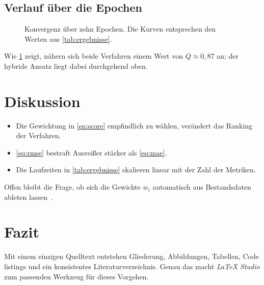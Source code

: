 \documentclass[11pt,a4paper]{article}
\begin{document}
\subsection{Verlauf über die Epochen}

\begin{figure}[htbp]
  \centering
  \caption{Konvergenz über zehn Epochen. Die Kurven entsprechen den Werten aus
    \cref{tab:ergebnisse}.}
  \label{fig:konvergenz}
\end{figure}

Wie \cref{fig:konvergenz} zeigt, nähern sich beide Verfahren einem Wert von
$Q \approx 0{,}87$ an; der hybride Ansatz liegt dabei durchgehend oben.

\section{Diskussion}
\label{sec:diskussion}

\begin{itemize}[leftmargin=*]
  \item Die Gewichtung in \cref{eq:score} empfindlich zu wählen, verändert das
    Ranking der Verfahren.
  \item \cref{eq:rmse} bestraft Ausreißer stärker als \cref{eq:mae}.
  \item Die Laufzeiten in \cref{tab:ergebnisse} skalieren linear mit der Zahl
    der Metriken.
\end{itemize}

Offen bleibt die Frage, ob sich die Gewichte $w_i$ automatisch aus
Bestandsdaten ableten lassen~\cite{mittelbach2004}.

\section{Fazit}
\label{sec:fazit}

Mit einem einzigen Quelltext entstehen Gliederung, Abbildungen, Tabellen,
Code listings und ein konsistentes Literaturverzeichnis. Genau das macht
\emph{LaTeX Studio} zum passenden Werkzeug für dieses Vorgehen.


\clearpage


\end{document}
